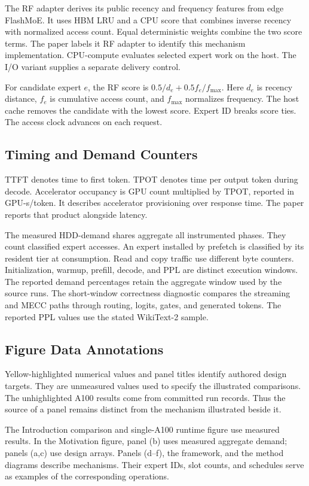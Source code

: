 \documentclass[conference,9pt,letterpaper]{IEEEtran}
\begin{document}
The RF adapter derives its public recency and frequency features from edge FlashMoE. It uses HBM LRU and a CPU score that combines inverse recency with normalized access count. Equal deterministic weights combine the two score terms. The paper labels it RF adapter to identify this mechanism implementation. CPU-compute evaluates selected expert work on the host. The I/O variant supplies a separate delivery control.

For candidate expert $e$, the RF score is $0.5/d_e+0.5f_e/f_{\max}$. Here $d_e$ is recency distance, $f_e$ is cumulative access count, and $f_{\max}$ normalizes frequency. The host cache removes the candidate with the lowest score. Expert ID breaks score ties. The access clock advances on each request.

\subsection{Timing and Demand Counters}
TTFT denotes time to first token. TPOT denotes time per output token during decode. Accelerator occupancy is GPU count multiplied by TPOT, reported in GPU-s/token. It describes accelerator provisioning over response time. The paper reports that product alongside latency.

The measured HDD-demand shares aggregate all instrumented phases. They count classified expert accesses. An expert installed by prefetch is classified by its resident tier at consumption. Read and copy traffic use different byte counters. Initialization, warmup, prefill, decode, and PPL are distinct execution windows. The reported demand percentages retain the aggregate window used by the source runs. The short-window correctness diagnostic compares the streaming and MECC paths through routing, logits, gates, and generated tokens. The reported PPL values use the stated WikiText-2 sample.

\subsection{Figure Data Annotations}
Yellow-highlighted numerical values and panel titles identify authored design targets. They are unmeasured values used to specify the illustrated comparisons. The unhighlighted A100 results come from committed run records. Thus the source of a panel remains distinct from the mechanism illustrated beside it.

The Introduction comparison and single-A100 runtime figure use measured results. In the Motivation figure, panel (b) uses measured aggregate demand; panels (a,c) use design arrays. Panels (d--f), the framework, and the method diagrams describe mechanisms. Their expert IDs, slot counts, and schedules serve as examples of the corresponding operations.
\end{document}
